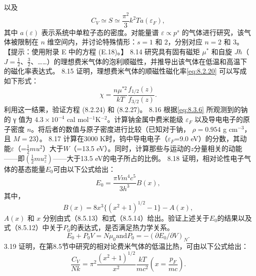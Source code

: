 以及
\begin{equation}\tag{8.13.2}\label{eq:8.13.2}
C _ { V } \simeq S \simeq \frac { \pi ^{2} } { 3 } k ^{2} T a ( \varepsilon _ { F } ) ,
\end{equation}
其中 \(a(\varepsilon)\) 表示系统中单粒子态的密度。对能量谱 \(\varepsilon \propto p^{s}\) 的气体进行研究，该气体被限制在 \(n\) 维空间内，并讨论特殊情形：\(s=1\) 和 \(2\)，分别对应 \(n=2\) 和 \(3\)。
【提示：使用附录 E 中的方程 (E.18)。】
8.14 研究具有固有磁矩 \(\mu^{*}\) 和自旋 \(J\hbar\)（\(J=\frac{1}{2}\)、\(\frac{3}{2}\)、\ldots\ldots）的理想费米气体的泡利顺磁性，并推导出该气体在低温和高温下的磁化率表达式。
8.15 证明，理想费米气体的顺磁性磁化率\autoref{eq:8.2.20} 可以写成如下形式：
\begin{equation}\tag{8.15.1}\label{eq:8.15.1}
\chi = \frac { n \mu ^{* 2} } { k T } \frac { f _ { 1 / 2 } ( z ) } { f _ { 3 / 2 } ( z ) } .
\end{equation}
利用这一结果，验证方程 (8.2.24) 和 (8.2.27)。
8.16 根据\autoref{eq:8.3.6} 所观测到的钠的 γ 值为 \(4.3 \times 10^{-4}\) cal mol\(^{-1}\)K\(^{-2}\)。计算钠金属中费米能级 \(\varepsilon_F\) 以及导电电子的原子密度 \(n\)。将后者的数值与原子密度进行比较（已知对于钠， \(\rho = 0.954\) g cm\(^{-3}\)，且 \(M = 23\)）。
8.17 计算在3000 K时，钨中导电电子（\(\varepsilon_{F}\)=9.0 eV）的分数，其动能\(\varepsilon\)（=\(\frac{1}{2}mu^{2}\)）大于\(W\)（=13.5 eV）。同时，计算那些与运动的\(z\)分量相关的动能——即\(\left(\frac{1}{2}mu_{z}^{2}\right)\)——大于13.5 eV的电子所占的比例。
8.18 证明，相对论性电子气体的基态能量\(E_{0}\)可由以下公式给出：
\begin{equation}\tag{8.18.1}\label{eq:8.18.1}
E _ { 0 } = \frac { \pi V m ^{4} c ^{5} } { 3 h ^{3} } B ( x ) ,
\end{equation}
其中，
\begin{equation}\tag{8.18.2}\label{eq:8.18.2}
B ( x ) = 8 x ^{3} \{ ( x ^{2} + 1 ) ^{1 / 2} - 1 \} - A ( x ) ,
\end{equation}
\(A(x)\) 和 \(x\) 分别由式（8.5.13）和式（8.5.14）给出。验证上述关于\(E_0\)的结果以及式（8.5.12）中关于\(P_0\)的表达式，是否满足热力学关系。
\begin{equation}\tag{8.18.3}\label{eq:8.18.3}
E _ { 0 } + P _ { 0 } V = N \mu _ { 0 }  \mathrm { a n d }  P _ { 0 } = - ( \partial E _ { 0 } / \partial V ) _ { N } .
\end{equation}
3.19 证明，在第8.5节中研究的相对论费米气体的低温比热，可由以下公式给出：
\begin{equation}\tag{8.18.4}\label{eq:8.18.4}
\frac { C _ { V } } { N k } = \pi ^{2} \frac { ( x ^{2} + 1 ) ^{1 / 2} } { x ^{2} } \frac { k T } { m c ^{2} }  \left( x = \frac { p _ { F } } { m c } \right) .
\end{equation}
